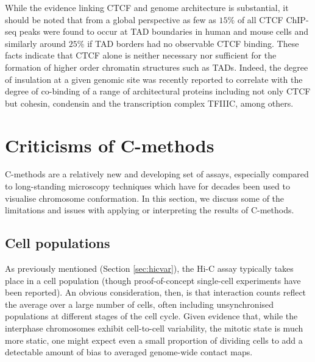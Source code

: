 \documentclass[a4paper,11pt,oneside]{book}
\begin{document}

While the evidence linking CTCF and genome architecture is substantial, it should be noted that from a global perspective as few as $15\%$ of all CTCF ChIP-seq peaks were found to occur at TAD boundaries in human and mouse cells\cite{Dixon2012} and similarly around $25\%$ if TAD borders had no observable CTCF binding.\cite{Sexton2015} These facts indicate that CTCF alone is neither necessary nor sufficient for the formation of higher order chromatin structures such as TADs. Indeed, the degree of insulation at a given genomic site was recently reported to correlate with the degree of co-binding of a range of architectural proteins including not only CTCF but cohesin, condensin and the transcription complex TFIIIC, among others.\cite{VanBortle2014}

%

\section{Criticisms of C-methods}

C-methods are a relatively new and developing set of assays, especially compared to long-standing microscopy techniques which have for decades been used to visualise chromosome conformation. In this section, we discuss some of the limitations and issues with applying or interpreting the results of C-methods.

\subsection{Cell populations}
As previously mentioned (Section \ref{sec:hicvar}), the Hi-C assay typically takes place in a cell population (though proof-of-concept single-cell experiments have been reported\cite{Nagano2013}). An obvious consideration, then, is that interaction counts reflect the average over a large number of cells, often including unsynchronised populations at different stages of the cell cycle.\cite{Fraser2015} Given evidence that, while the interphase chromosomes exhibit cell-to-cell variability, the mitotic state is much more static,\cite{Naumova2013, Dekker2014} one might expect even a small proportion of dividing cells to add a detectable amount of bias to averaged genome-wide contact maps.
\end{document}
